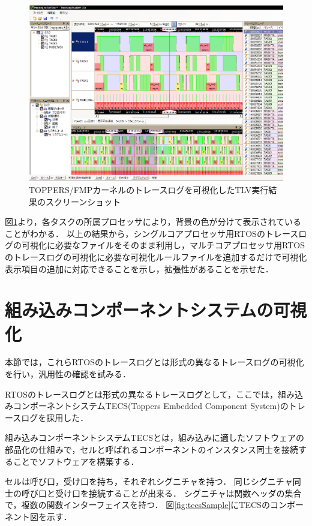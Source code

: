 \begin{figure}[t]
\begin{center}
\includegraphics[width=15cm]{img/fmpTLVscreenShot.eps}
\caption{TOPPERS/FMPカーネルのトレースログを可視化したTLV実行結果のスクリーンショット}
\label{fig:fmpTLVscreenShot}
\end{center}
\end{figure}

図\ref{fig:fmpTLVscreenShot}より，各タスクの所属プロセッサにより，背景の色が分けて表示されていることがわかる．
以上の結果から，シングルコアプロセッサ用RTOSのトレースログの可視化に必要なファイルをそのまま利用し，マルチコアプロセッサ用RTOSのトレースログの可視化に必要な可視化ルールファイルを追加するだけで可視化表示項目の追加に対応できることを示し，拡張性があることを示せた．

\section{組み込みコンポーネントシステムの可視化}

本節では，これらRTOSのトレースログとは形式の異なるトレースログの可視化を行い，汎用性の確認を試みる．

RTOSのトレースログとは形式の異なるトレースログとして，ここでは，組み込みコンポーネントシステムTECS(Toppers Embedded Component System)\cite{TOPPERS}のトレースログを採用した．

組み込みコンポーネントシステムTECSとは，組み込みに適したソフトウェアの部品化の仕組みで，セルと呼ばれるコンポーネントのインスタンス同士を接続することでソフトウェアを構築する．

セルは呼び口，受け口を持ち，それぞれシグニチャを持つ．
同じシグニチャ同士の呼び口と受け口を接続することが出来る．
シグニチャは関数ヘッダの集合で，複数の関数インターフェイスを持つ．
図\ref{fig:tecsSample}にTECSのコンポーネント図を示す．

